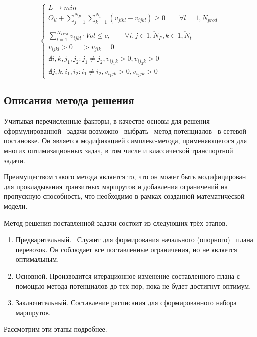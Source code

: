 	\begin{equation}
	\left\{ \begin{array}{ccc}	
		L \to min \\
		O_{il} + \sum_{j=1}^{N_P} \sum_{k=1}^{N_t} (v_{jikl} - v_{ijkl}) \ge 0 \qquad  \forall l = \overline{1, N_{prod}} \\
		\\
		\sum_{l=1}^{N_{Prod}} v_{ijkl} \cdot Vol \le c, \qquad \forall i, j \in \overline{1, N_P}, k \in \overline{1, N_t} \\
		v_{ijkl} > 0 => v_{jik} = 0 \\
		\nexists i, k, j_1, j_2: j_1 \ne j_2, v_{ij_1k} > 0, v_{ij_2k} > 0 \\
		\nexists j, k, i_1, i_2: i_1 \ne i_2, v_{i_1jk} > 0, v_{i_2jk} > 0 
	\end{array}	\right.
	\end{equation}

\subsection{Описания метода решения}
	Учитывая перечисленные факторы, в качестве основы для решения сформулированной \, задачи возможно \, выбрать \, метод потенциалов \, в сетевой \, постановке\cite{trans:polycrit}. Он является модификацией симплекс-метода, применяющегося для многих оптимизационных задач, в том числе и классической транспортной задачи\cite{trans:potential}.
		
	Преимуществом такого метода является то, что он может быть модифицирован для прокладывания транзитных маршрутов и добавления ограничений на пропускную способность, что необходимо в рамках созданной математической модели.
	
	Метод решения поставленной задачи состоит из следующих трёх этапов.
	\begin{enumerate}
		\item Предварительный. \, Служит для формирования начального (опорного) \, плана перевозок. Он соблюдает все поставленные ограничения, но не является оптимальным.
		\item Основной. Производится итерационное изменение составленного плана с помощью метода потенциалов до тех пор, пока не будет достигнут оптимум.
		\item Заключительный. Составление расписания для сформированного набора маршрутов.
	\end{enumerate} 

	Рассмотрим эти этапы подробнее.
	
